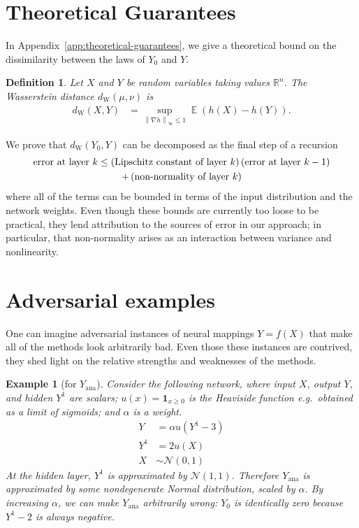 \documentclass{article}
\newtheorem{definition}{Definition}
\newtheorem{example}{Example}
\DeclareMathOperator{\expect}{\mathbb{E}}
\begin{document}
\section{Theoretical Guarantees}
In Appendix~\ref{app:theoretical-guarantees}, we give a theoretical bound on the dissimilarity between the laws of \(Y_0\) and \(Y\).

\begin{definition}
Let \(X\) and \(Y\) be random variables taking values  \(\mathbb{R}^n\).
The Wasserstein distance \(d_\text{W} (\mu, \nu)\) is 
\begin{align*}
  d_\mathrm{W}(X, Y) &= \sup_{\left\|\nabla h\right\|_{\infty} \leq 1} \expect (h(X) - h(Y)).
\end{align*}
\end{definition}

We prove that \(d_\mathrm{W}(Y_0, Y)\) can be decomposed as
the final step of a recursion
\begin{multline}
  \text{error at layer \(k\)}
  \leq \del{\text{Lipschitz constant of layer \(k\)}} \del{\text{error at layer \(k-1\)}}
  \\
  + \del{\text{non-normality of layer \(k\)}}
\end{multline}
where all of the terms can be bounded in terms of the input distribution and the network weights.
Even though these bounds are currently too loose to be practical, they lend attribution to the sources of error in our approach; in particular, that non-normality arises as an interaction between variance and nonlinearity.


\section{Adversarial examples}
\label{sec:adversariality}
One can imagine adversarial instances of neural mappings \(Y=f(X)\) that make all of the methods look arbitrarily bad.
Even those these instances are contrived, they shed light on the relative strengths and weaknesses of the methods.

\begin{example}[for \(Y_\mathrm{ana}\)]
  Consider the following network, where input \(X\), output \(Y\), and hidden \(Y^1\) are scalars; \(u(x) = \bm{1}_{x \geq 0}\) is the Heaviside function e.g.~obtained as a limit of sigmoids; and \(\alpha\) is a weight.
  \begin{align*}
    Y &= \alpha u(Y^1 - 3)
    \\
    Y^1 &= 2 u(X)
    \\
    X &\sim \mathcal N(0, 1)
  \end{align*}
  At the hidden layer, \(Y^1 \) is approximated by \(\mathcal N(1, 1)\).
  Therefore \(Y_\mathrm{ana}\) is approximated by some nondegenerate Normal distribution, scaled by \(\alpha\).
  By increasing \(\alpha\), we can make \(Y_\mathrm{ana}\) arbitrarily wrong:
  \(Y_0\) is identically zero because \(Y^1 -2 \) is always negative.

  
\end{example}
\end{document}
